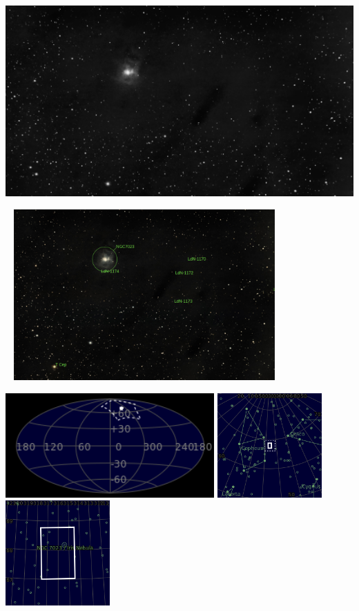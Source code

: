 {\footnotesize\color{white}


}\ \\
\includegraphics[width=\textwidth]{../Imaging//Grayscale/Iris_Nebula.jpg}
\begin{center}
 \ \newpage
\includegraphics[width=0.75\textwidth]{../Imaging//Annotated/Iris_Nebula_Annotated.jpg}

\includegraphics[height=4cm]{../Imaging//Annotated/Iris_Nebula_Globe.jpg}
\includegraphics[height=4cm]{../Imaging//Annotated/Iris_Nebula_Close.jpg}
\includegraphics[height=4cm]{../Imaging//Annotated/Iris_Nebula_Closer.jpg}
\end{center}
